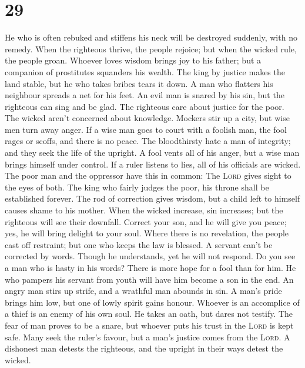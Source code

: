 \hypertarget{section-28}{%
\section{29}\label{section-28}}

 He who is often rebuked and stiffens his neck will be
destroyed suddenly, with no remedy.  When the righteous
thrive, the people rejoice; but when the wicked rule, the people groan.
 Whoever loves wisdom brings joy to his father; but a
companion of prostitutes squanders his wealth.  The king
by justice makes the land stable, but he who takes bribes tears it down.
 A man who flatters his neighbour spreads a net for his
feet.  An evil man is snared by his sin, but the righteous
can sing and be glad.  The righteous care about justice
for the poor. The wicked aren't concerned about knowledge.
 Mockers stir up a city, but wise men turn away anger.
 If a wise man goes to court with a foolish man, the fool
rages or scoffs, and there is no peace.  The bloodthirsty
hate a man of integrity; and they seek the life of the upright.
 A fool vents all of his anger, but a wise man brings
himself under control.  If a ruler listens to lies, all
of his officials are wicked.  The poor man and the
oppressor have this in common: The \textsc{Lord} gives sight to the eyes
of both.  The king who fairly judges the poor, his throne
shall be established forever.  The rod of correction
gives wisdom, but a child left to himself causes shame to his mother.
 When the wicked increase, sin increases; but the
righteous will see their downfall.  Correct your son, and
he will give you peace; yes, he will bring delight to your soul.
 Where there is no revelation, the people cast off
restraint; but one who keeps the law is blessed.  A
servant can't be corrected by words. Though he understands, yet he will
not respond.  Do you see a man who is hasty in his words?
There is more hope for a fool than for him.  He who
pampers his servant from youth will have him become a son in the end.
 An angry man stirs up strife, and a wrathful man abounds
in sin.  A man's pride brings him low, but one of lowly
spirit gains honour.  Whoever is an accomplice of a thief
is an enemy of his own soul. He takes an oath, but dares not testify.
 The fear of man proves to be a snare, but whoever puts
his trust in the \textsc{Lord} is kept safe.  Many seek
the ruler's favour, but a man's justice comes from the \textsc{Lord}.
 A dishonest man detests the righteous, and the upright
in their ways detest the wicked.

